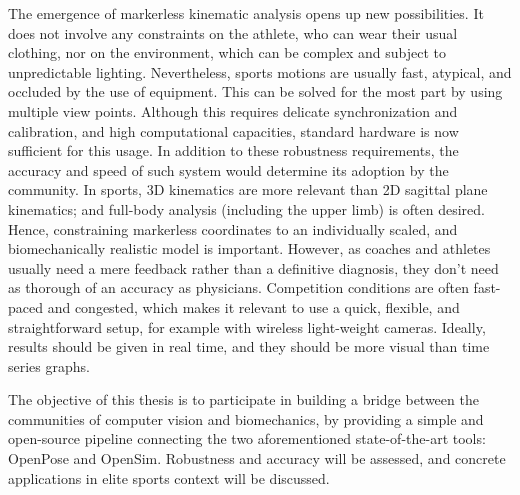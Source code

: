 The emergence of markerless kinematic analysis opens up new possibilities. It does not involve any constraints on the athlete, who can wear their usual clothing, nor on the environment, which can be complex and subject to unpredictable lighting. Nevertheless, sports motions are usually fast, atypical, and occluded by the use of equipment. This can be solved for the most part by using multiple view points. Although this requires delicate synchronization and calibration, and high computational capacities, standard hardware is now sufficient for this usage. In addition to these robustness requirements, the accuracy and speed of such system would determine its adoption by the community. In sports, 3D kinematics are more relevant than 2D sagittal plane kinematics; and full-body analysis (including the upper limb) is often desired. Hence, constraining markerless coordinates to an individually scaled, and biomechanically realistic model is important. However, as coaches and athletes usually need a mere feedback rather than a definitive diagnosis, they don't need as thorough of an accuracy as physicians. Competition conditions are often fast-paced and congested, which makes it relevant to use a quick, flexible, and straightforward setup, for example with wireless light-weight cameras. Ideally, results should be given in real time, and they should be more visual than time series graphs. 

The objective of this thesis is to participate in building a bridge between the communities of computer vision and biomechanics, by providing a simple and open-source pipeline connecting the two aforementioned state-of-the-art tools: OpenPose and OpenSim. Robustness and accuracy will be assessed, and concrete applications in elite sports context will be discussed. 


